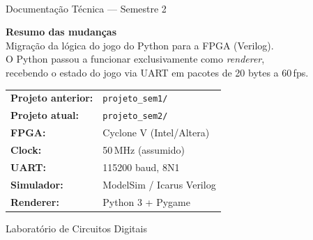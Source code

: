 \documentclass[12pt,a4paper]{article}
\begin{document}
\begin{titlepage}
    \centering
    \vspace*{2cm}

    \\[0.5cm]
    {\large Documentação Técnica — Semestre 2}\\[2cm]

    \begin{mdframed}[linecolor=fpgablue, linewidth=2pt, innertopmargin=12pt, innerbottommargin=12pt]
    \centering
    \textbf{Resumo das mudanças}\\[6pt]
    Migração da lógica do jogo do Python para a FPGA (Verilog).\\
    O Python passou a funcionar exclusivamente como \emph{renderer},\\
    recebendo o estado do jogo via UART em pacotes de 20 bytes a 60\,fps.
    \end{mdframed}

    \vspace{1.5cm}

    \begin{tabular}{ll}
        \textbf{Projeto anterior:} & \texttt{projeto\_sem1/} \\[4pt]
        \textbf{Projeto atual:}    & \texttt{projeto\_sem2/} \\[4pt]
        \textbf{FPGA:}             & Cyclone V (Intel/Altera) \\[4pt]
        \textbf{Clock:}            & 50\,MHz (assumido) \\[4pt]
        \textbf{UART:}             & 115200 baud, 8N1 \\[4pt]
        \textbf{Simulador:}        & ModelSim / Icarus Verilog \\[4pt]
        \textbf{Renderer:}         & Python 3 + Pygame \\
    \end{tabular}

    \vfill
    {\small Laboratório de Circuitos Digitais}
\end{titlepage}
\end{document}
